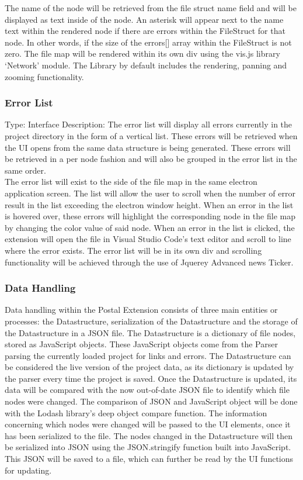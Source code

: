 \documentclass[letterpaper,10pt,titlepage,draftclsnofoot,onecolumn,onesided] {IEEEtran}
\begin{document}
	The name of the node will be retrieved from the file struct name field and will be displayed as text inside of the node.
	An asterisk will appear next to the name text within the rendered node if there are errors within the FileStruct for that node. In other words, if the size of the errors[] array within the FileStruct is not zero.
	The file map will be rendered within its own div using the vis.js library ‘Network' module. The Library by default includes the rendering, panning and zooming functionality.
	
	\subsubsection{Error List}
	Type: Interface
	Description: 
	The error list will display all errors currently in the project directory in the form of a vertical list. 
	These errors will be retrieved when the UI opens from the same data structure is being generated. 
	These errors will be retrieved in a per node fashion and will also be grouped in the error list in the same order. 
	\\
	The error list will exist to the side of the file map in the same electron application screen. 
	The list will allow the user to scroll when the number of error result in the list exceeding the electron window height. 
	When an error in the list is hovered over, these errors will highlight the corresponding node in the file map by changing the color value of said node. 
	When an error in the list is clicked, the extension will open the file in Visual Studio Code's text editor and scroll to line where the error exists.
	The error list will be in its own div and scrolling functionality will be achieved through the use of Jquerey Advanced news Ticker.

	\subsubsection{Data Handling}
	Data handling within the Postal Extension consists of three main entities or processes: the Datastructure, serialization of the Datastructure and the storage of the Datastructure in a JSON file.
	The Datastructure is a dictionary of file nodes, stored as JavaScript objects. These JavaScript objects come from the Parser parsing the currently loaded project for links and errors.
	The Datastructure can be considered the live version of the project data, as its dictionary is updated by the parser every time the project is saved. 
	Once the Datastructure is updated, its data will be compared with the now out-of-date JSON file to identify which file nodes were changed.
	The comparison of JSON and JavaScript object will be done with the Lodash library's deep object compare function.
	The information concerning which nodes were changed will be passed to the UI elements, once it has been serialized to the file.
	The nodes changed in the Datastructure will then be serialized into JSON using the JSON.stringify function built into JavaScript.
	This JSON will be saved to a file, which can further be read by the UI functions for updating.
\end{document}

